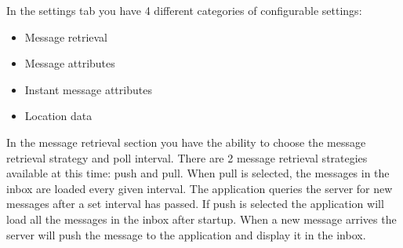 In the settings tab you have 4 different categories of configurable settings:
\begin{itemize}
\item{}Message retrieval
\item{}Message attributes
\item{}Instant message attributes
\item{}Location data
\end{itemize}

\newpage
In the message retrieval section you have the ability to choose the message retrieval strategy and poll interval. 
\newline 
\newline
There are 2 message retrieval strategies available at this time: push and pull. When pull is selected, the messages in the inbox are loaded every given interval. The application queries the server for new messages after a set interval has passed. \newline 
If push is selected the application will load all the messages in the inbox after startup. When a new message arrives the server will push the message to the application and display it in the inbox. 

